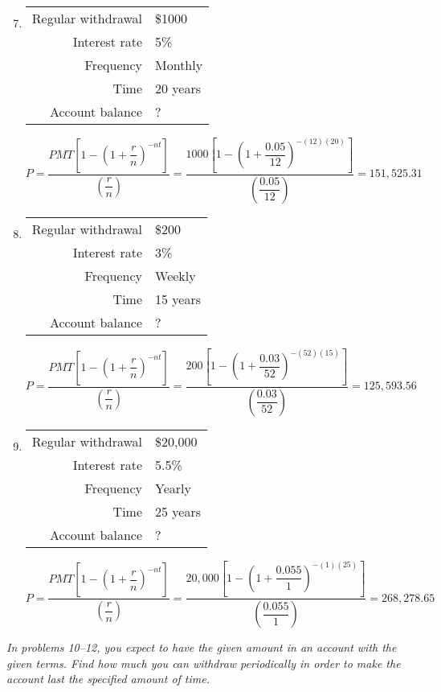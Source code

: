 \begin{enumerate}
\setcounter{enumi}{6}
\item \begin{tabular}{r l}
Regular withdrawal & \$1000\\
Interest rate & 5\%\\
Frequency & Monthly\\
Time & 20 years\\
Account balance & ?
\end{tabular} 
\[P = \dfrac{PMT\left[1-\left(1+\dfrac{r}{n}\right)^{-nt}\right]}{\left(\dfrac{r}{n}\right)} = \dfrac{1000\left[1-\left(1+\dfrac{0.05}{12}\right)^{-(12)(20)}\right]}{\left(\dfrac{0.05}{12}\right)} = 151,525.31\]

\item \begin{tabular}{r l}
Regular withdrawal & \$200\\
Interest rate & 3\%\\
Frequency & Weekly\\
Time & 15 years\\
Account balance & ?
\end{tabular} 
\[P = \dfrac{PMT\left[1-\left(1+\dfrac{r}{n}\right)^{-nt}\right]}{\left(\dfrac{r}{n}\right)} = \dfrac{200\left[1-\left(1+\dfrac{0.03}{52}\right)^{-(52)(15)}\right]}{\left(\dfrac{0.03}{52}\right)} = 125,593.56\]

\item \begin{tabular}{r l}
Regular withdrawal & \$20,000\\
Interest rate & 5.5\%\\
Frequency & Yearly\\
Time & 25 years\\
Account balance & ?
\end{tabular} 
\[P = \dfrac{PMT\left[1-\left(1+\dfrac{r}{n}\right)^{-nt}\right]}{\left(\dfrac{r}{n}\right)} = \dfrac{20,000\left[1-\left(1+\dfrac{0.055}{1}\right)^{-(1)(25)}\right]}{\left(\dfrac{0.055}{1}\right)} = 268,278.65\]
\end{enumerate}

\emph{In problems 10--12, you expect to have the given amount in an account with the given terms.  Find how much you can withdraw periodically in order to make the account last the specified amount of time.}

